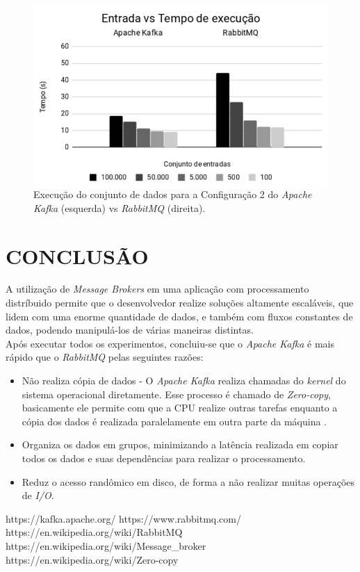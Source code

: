 \documentclass[letterpaper, 10 pt, conference]{ieeeconf}  %
\begin{document}
\begin{figure}[!htbp]
\centerline{\includegraphics[scale=0.4]{confg2.png}}
\caption{Execução do conjunto de dados para a Configuração 2 do \textit{Apache Kafka} (esquerda) vs \textit{RabbitMQ} (direita).}
\label{grafico_kafka_confg_2}
\end{figure}



\section{CONCLUSÃO}

A utilização de \textit{Message Brokers} em uma aplicação com processamento distríbuido permite que o desenvolvedor realize soluções altamente escaláveis, que lidem com uma enorme quantidade de dados, e também com fluxos constantes de dados, podendo manipulá-los de várias maneiras distintas. \\
Após executar todos os experimentos, concluiu-se que o \textit{Apache Kafka} é mais rápido que o \textit{RabbitMQ} pelas seguintes razões:

\begin{itemize}
\item Não realiza cópia de dados - O \textit{Apache Kafka} realiza chamadas do \textit{kernel} do sistema operacional diretamente. Esse processo é chamado de \textit{Zero-copy}, basicamente ele permite com que a CPU realize outras tarefas enquanto a cópia dos dados é realizada paralelamente em outra parte da máquina \cite{c5}.
\item Organiza os dados em grupos, minimizando a latência realizada em copiar todos os dados e suas dependências para realizar o processamento. 
\item Reduz o acesso randômico em disco, de forma a não realizar muitas operações de \textit{I/O}.
\end{itemize}





\begin{thebibliography}{99}

 https://kafka.apache.org/
 https://www.rabbitmq.com/
 https://en.wikipedia.org/wiki/RabbitMQ
 https://en.wikipedia.org/wiki/Message\_broker
 https://en.wikipedia.org/wiki/Zero-copy
\end{thebibliography}
\end{document}
